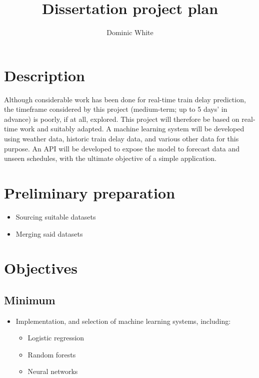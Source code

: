 \documentclass[11pt]{article} %
\title{Dissertation project plan}
\author{Dominic White}
\begin{document}
\maketitle

\section*{Description}

Although considerable work has been done for real-time train delay prediction, the timeframe considered by this project (medium-term; up to 5 days’ in advance) is poorly, if at all, explored. This project will therefore be based on real-time work and suitably adapted. A machine learning system will be developed using weather data, historic train delay data, and various other data for this purpose. An API will be developed to expose the model to forecast data and unseen schedules, with the ultimate objective of a simple application.

\section*{Preliminary preparation}

\begin{itemize}

	\item{Sourcing suitable datasets}
	\item{Merging said datasets}

\end{itemize}

\section*{Objectives}

\subsection*{Minimum}

\begin{itemize}

	\item{Implementation, and selection of machine learning systems, including:

		\begin{itemize}

			\item{Logistic regression}
			\item{Random forests}
			\item{Neural networks}
		
		\end{itemize}

	}

\end{itemize}
\end{document}
